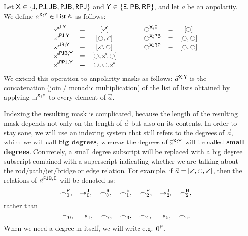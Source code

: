 \documentclass[a4paper]{memoir}
\begin{document}
\begin{definition} \label{def:pb}
	Let $\mathsf{X} \in \mathopen{}\left\{ \mathsf{J}, \mathsf{PJ}, \mathsf{JB}, \mathsf{PJB}, \mathsf{RPJ} \right\}\mathclose{}$ and $\mathsf{Y} \in \mathopen{}\left\{ \mathsf{E}, \mathsf{PB}, \mathsf{RP} \right\}\mathclose{}$, and let $a$ be an anpolarity.
	We define $a^{\mathsf{X};\mathsf{Y}} \in {\mathsf{List}}\,{\mathbb{A}}$ as follows:
	\[
		\begin{array}{l c c c l c c}
			\maskop \ypolar \maskj \mymasky &=& [\ypolar]
			&\qquad&
			\maskop \npolar \mymaskx \maske &=& [\npolar]
			\\
			\maskop \ypolar \maskpj \mymasky &=& [\npolar, \ypolar]
			&\qquad&
			\maskop \npolar \mymaskx \maskpb &=& [\npolar, \npolar]
			\\
			\maskop \ypolar \maskjb \mymasky &=& [\ypolar, \npolar]
			&\qquad&
			\maskop \npolar \mymaskx \maskrp &=& [\npolar, \npolar]
			\\
			\maskop \ypolar \maskpjb \mymasky &=& [\npolar, \ypolar, \npolar]
			\\
			\maskop \ypolar \maskrpj \mymasky &=& [\npolar, \npolar, \ypolar]
		\end{array}
	\]
	We extend this operation to anpolarity masks as follows: $\vec a^{\mathsf{X};\mathsf{Y}}$ is the concatenation (join / monadic multiplication) of the list of lists obtained by applying ${\llcorner\hspace{-.4ex}\lrcorner}^{\mathsf{X};\mathsf{Y}}$ to every element of $\vec a$.
	
	Indexing the resulting mask is complicated, because the length of the resulting mask depends not only on the length of $\vec a$ but also on its contents.
	In order to stay sane, we will use an indexing system that still refers to the degrees of $\vec a$, which we will call \textbf{big degrees}, whereas the degrees of $\vec a^{\mathsf{X};\mathsf{Y}}$ will be called \textbf{small degrees}.
	Concretely, a small degree subscript will be replaced with a big degree subscript combined with a superscript indicating whether we are talking about the rod/path/jet/bridge or edge relation.
	For example, if $\vec a = [\ypolar, \npolar, \ypolar]$, then the relations of $\vec a^{\mathsf{PJB};\mathsf{E}}$ will be denoted as:
	\[
		\frown^{\mathsf{P}}_0, \quad
		\rightarrowtriangle^{\mathsf{J}}_0, \quad
		\frown^{\mathsf{B}}_0, \quad
		\frown^{\mathsf{E}}_1, \quad
		\frown^{\mathsf{P}}_2, \quad
		\rightarrowtriangle^{\mathsf{J}}_2, \quad
		\frown^{\mathsf{B}}_2,
	\]
	rather than
	\[
		\frown_0, \quad
		\rightarrowtriangle_1, \quad
		\frown_2, \quad
		\frown_3, \quad
		\frown_4, \quad
		\rightarrowtriangle_5, \quad
		{\frown_6}.
	\]
	When we need a degree in itself, we will write e.g.\ ${0}^{\mathsf{P}}$.
\end{definition}
\end{document}
